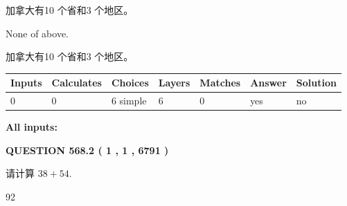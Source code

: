 \documentclass{ctexart}
\begin{document}
 
加拿大有10 个省和3 个地区。
 
 
 None of above.
 
 
\noindent{}
 
 
加拿大有10 个省和3 个地区。
 
 
\noindent{}
 
 
   
   
   
   
\noindent\begin{tabular}{|l|l|l|l|l|l|l|}
 \hline
Inputs & Calculates & Choices & Layers & Matches & Answer & Solution \\ \hline
 0  & 
 0  & 
 6
  simple  
  & 
 6  & 
 0  & 
  yes & 
  no 
  \\ \hline
 \end{tabular}
   
   
   
   
\noindent{}
   
   
   
   
\noindent\vspace{0.1in}\hspace{-0.08in} {\textbf{\Large{All inputs: }}}
   
   
  
\vspace{0.2in}
  
{\textbf{\Large{QUESTION
568.2 
 ( 1 , 1 , 6791 )
}}}
  
  
 
请计算 $ %
38 +  %
54 $.
 
 
 
\noindent{}
 
 

92
 
 
\noindent{}
 
 

 
 
 
\noindent{}
 
 
\end{document}
